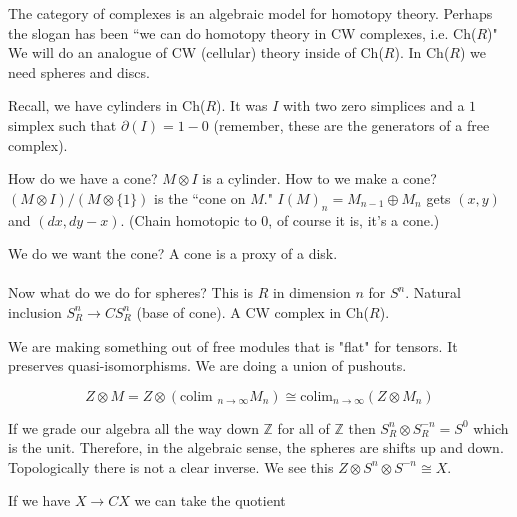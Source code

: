 \documentclass[10pt]{article}
\theoremstyle{definition}
\begin{document}
	The category of complexes is an algebraic model for homotopy theory. Perhaps the slogan has been ``we can do homotopy theory in CW complexes, i.e. Ch($R$)" We will do an analogue of CW (cellular) theory inside of Ch($R$). In Ch($R$) we need spheres and discs. 
	
	Recall, we have cylinders in Ch($R$). It was $I$ with two zero simplices and a $1$ simplex such that $\partial(I)={1}-{0}$ (remember, these are the generators of a free complex). 
	
	How do we have a cone? $M\otimes I$ is a cylinder. How to we make a cone? $(M\otimes I)/(M\otimes \{1\})$ is the ``cone on $M$." $I(M)_n=M_{n-1}\oplus M_n$ gets $(x,y)$ and $(dx,dy-x)$. (Chain homotopic to $0$, of course it is, it's a cone.)
	
	We do we want the cone? A cone is a proxy of a disk. 
	\\\\
	Now what do we do for spheres? This is $R$ in dimension $n$ for $S^n$.  Natural inclusion $S_R^n \to CS_R^n$ (base of cone). A CW complex in Ch($R$).
	\begin{center}
	\end{center}
	We are making something out of free modules that is "flat" for tensors. It preserves quasi-isomorphisms. We are doing a union of pushouts. 
	
	\[Z\otimes M=Z\otimes (\text{colim }_{n\to\infty} M_n)\cong \text{colim}_{n\to\infty}(Z\otimes M_n)\]
	
	If we grade our algebra all the way down $\mathbb{Z}$ for all of $\mathbb{Z}$ then $S_R^{n}\otimes S_R^{-n}=S^0$ which is the unit. Therefore, in the algebraic sense, the spheres are shifts up and down. Topologically there is not a clear inverse. We see this $Z\otimes S^n\otimes S^{-n}\cong X$. 
	
	If we have $X\to CX$ we can take the quotient \begin{center}
		\\
	\end{center}
	
\end{document}
